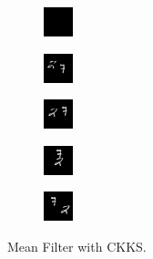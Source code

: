     \begin{subfigure}[t]{0.9\textwidth}
        \centering
        \begin{subfigure}[t]{0.19\textwidth}
            \centering
            \includegraphics[scale=2]{figures/CKKS-MEAN/frame0}
        \end{subfigure}
        \hfill
        \begin{subfigure}[t]{0.19\textwidth}
            \centering
            \includegraphics[scale=2]{figures/CKKS-MEAN/frame4}
        \end{subfigure}
        \hfill
        \begin{subfigure}[t]{0.19\textwidth}
            \centering
            \includegraphics[scale=2]{figures/CKKS-MEAN/frame8}
        \end{subfigure}
        \hfill
        \begin{subfigure}[t]{0.19\textwidth}
            \centering
            \includegraphics[scale=2]{figures/CKKS-MEAN/frame12}
        \end{subfigure}
        \hfill
        \begin{subfigure}[t]{0.19\textwidth}
            \centering
            \includegraphics[scale=2]{figures/CKKS-MEAN/frame16}
        \end{subfigure}
        \caption{Mean Filter with CKKS.}
    \end{subfigure}
    \\ \bigskip
